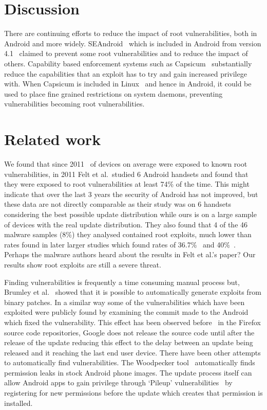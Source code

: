 \documentclass[conference,a4paper,twoside]{IEEEtran}
\begin{document}
\section{Discussion}
There are continuing efforts to reduce the impact of root vulnerabilities, both in Android and more widely.
SEAndroid~\cite{Smalley2013} which is included in Android from version 4.1~\cite{jelly-bean-release} claimed to prevent some root vulnerabilities and to reduce the impact of others.
Capability based enforcement systems such as Capsicum~\cite{Watson2010} substantially reduce the capabilities that an exploit has to try and gain increased privilege with.
When Capsicum is included in Linux~\cite{TODO} and hence in Android, it could be used to place fine grained restrictions on system daemons, preventing vulnerabilities becoming root vulnerabilities.

\section{Related work}
\label{sec:related}
We found that since 2011 \daMeanInsecurityPerc\ of devices on average were exposed to known root vulnerabilities, in 2011 Felt et al.\ studied 6 Android handsets and found that they were exposed to root vulnerabilities at least 74\% of the time.
This might indicate that over the last 3 years the security of Android has not improved, but these data are not directly comparable as their study was on 6 handsets considering the best possible update distribution while ours is on a large sample of devices with the real update distribution.
They also found that 4 of the 46 malware samples (8\%) they analysed contained root exploits, much lower than rates found in later larger studies which found rates of 36.7\%~\cite{Zhou2012b} and 40\%~\cite{Zhou2012a}.
Perhaps the malware authors heard about the results in Felt et al.'s paper?
Our results show root exploits are still a severe threat.

Finding vulnerabilities is frequently a time consuming manual process but, Brumley et al.~\cite{Brumley2008} showed that it is possible to automatically generate exploits from binary patches.
In a similar way some of the vulnerabilities which have been exploited were publicly found by examining the commit made to the Android which fixed the vulnerability.
This effect has been observed before~\cite{Barth2011} in the Firefox source code repositories, Google does not release the source code until after the release of the update reducing this effect to the delay between an update being released and it reaching the last end user device.
There have been other attempts to automatically find vulnerabilities.
The Woodpecker tool~\cite{Grace2012} automatically finds permission leaks in stock Android phone images.
The update process itself can allow Android apps to gain privilege through `Pileup' vulnerabilities~\cite{Xing2014} by registering for new permissions before the update which creates that permission is installed.
\end{document}

